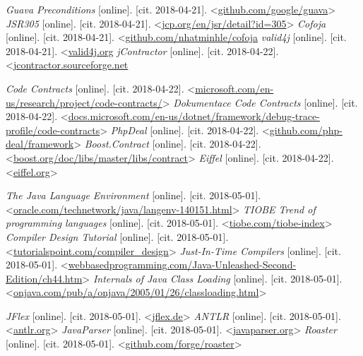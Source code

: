 \begin{thebibliography}{99}
 {\it Guava Preconditions} [online]. [cit. 2018-04-21]. \textless\url{github.com/google/guava}\textgreater
{} {\it JSR305} [online]. [cit. 2018-04-21]. \textless\url{jcp.org/en/jsr/detail?id=305}\textgreater
{} {\it Cofoja} [online]. [cit. 2018-04-21]. \textless\url{github.com/nhatminhle/cofoja}
 {\it valid4j} [online]. [cit. 2018-04-21]. \textless\url{valid4j.org}	
 {\it jContractor} [online]. [cit. 2018-04-22]. \textless\url{jcontractor.sourceforge.net}

 {\it Code Contracts} [online]. [cit. 2018-04-22]. \textless\url{microsoft.com/en-us/research/project/code-contracts/}\textgreater
{} {\it Dokumentace Code Contracts} [online]. [cit. 2018-04-22]. \textless\url{docs.microsoft.com/en-us/dotnet/framework/debug-trace-profile/code-contracts}\textgreater
{} {\it PhpDeal} [online]. [cit. 2018-04-22]. \textless\url{github.com/php-deal/framework}\textgreater
{} {\it Boost.Contract} [online]. [cit. 2018-04-22]. \textless\url{boost.org/doc/libs/master/libs/contract}\textgreater
{} {\it Eiffel} [online]. [cit. 2018-04-22]. \textless\url{eiffel.org}\textgreater

 {\it The Java Language Environment} [online]. [cit. 2018-05-01]. \textless\url{oracle.com/technetwork/java/langenv-140151.html}\textgreater
{} {\it TIOBE Trend of programming languages} [online]. [cit. 2018-05-01]. \textless\url{tiobe.com/tiobe-index}\textgreater
{} {\it Compiler Design Tutorial} [online]. [cit. 2018-05-01]. \textless\url{tutorialspoint.com/compiler_design}\textgreater
{} {\it Just-In-Time Compilers} [online]. [cit. 2018-05-01]. \textless\url{webbasedprogramming.com/Java-Unleashed-Second-Edition/ch44.htm}\textgreater
{} {\it Internals of Java Class Loading} [online]. [cit. 2018-05-01]. \textless\url{onjava.com/pub/a/onjava/2005/01/26/classloading.html}\textgreater

 {\it JFlex} [online]. [cit. 2018-05-01]. \textless\url{jflex.de}\textgreater
{} {\it ANTLR} [online]. [cit. 2018-05-01]. \textless\url{antlr.org}\textgreater
{} {\it JavaParser} [online]. [cit. 2018-05-01]. \textless\url{javaparser.org}\textgreater
{} {\it Roaster} [online]. [cit. 2018-05-01]. \textless\url{github.com/forge/roaster}\textgreater





\end{thebibliography}
